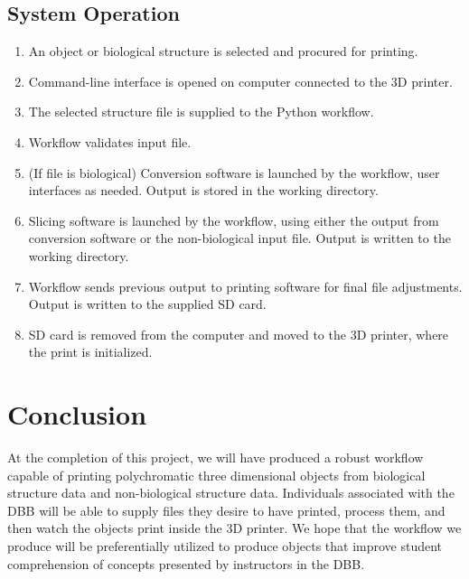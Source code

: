 \documentclass[letterpaper, onecolumn, draftclsnofoot, 10pt, compsoc]{IEEEtran}
\begin{document}
\begin{singlespace}
	\subsection{System Operation}
		\begin{enumerate}
    		\item An object or biological structure is selected and procured for printing.
            \item Command-line interface is opened on computer connected to the 3D printer.
            \item The selected structure file is supplied to the Python workflow.
            \item Workflow validates input file.
            \item (If file is biological) Conversion software is launched by the workflow, user interfaces as needed. Output is stored in the working directory.
            \item Slicing software is launched by the workflow, using either the output from conversion software or the non-biological input file. Output is written to the working directory.
            \item Workflow sends previous output to printing software for final file adjustments. Output is written to the supplied SD card.
            \item SD card is removed from the computer and moved to the 3D printer, where the print is initialized. 
		\end{enumerate}
        
\section{Conclusion}
At the completion of this project, we will have produced a robust workflow capable of printing polychromatic three dimensional objects from biological structure data and non-biological structure data.
Individuals associated with the DBB will be able to supply files they desire to have printed, process them, and then watch the objects print inside the 3D printer. 
We hope that the workflow we produce will be preferentially utilized to produce objects that improve student comprehension of concepts presented by instructors in the DBB.
\end{singlespace}

\newpage


\end{document}
